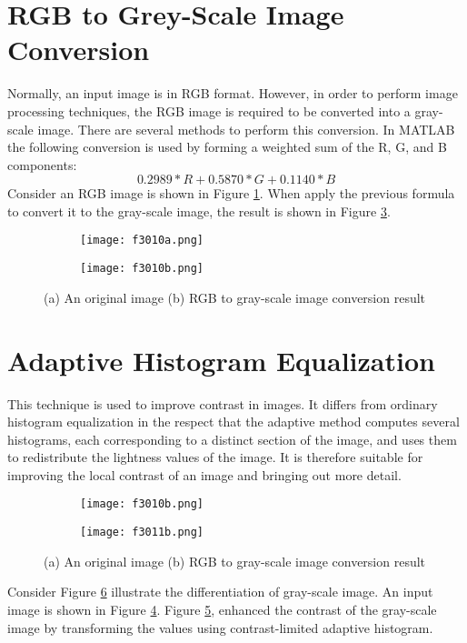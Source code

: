 \section{RGB to Grey-Scale Image Conversion}
Normally, an input image is in RGB format. However, in order to perform image processing techniques, the RGB image is required to be converted into a gray-scale image. There are several methods to perform this conversion. In MATLAB the following conversion is used by forming a weighted sum of the R, G, and B components:
\begin{equation}
	0.2989 * R + 0.5870 * G + 0.1140 * B
\end{equation}
Consider an RGB image is shown in Figure \ref{fig:f3010a}. When apply the previous formula to convert it to the gray-scale image, the result is shown in Figure \ref{fig:f3010b}.
\begin{figure}
	\centering
	\begin{subfigure}[b]{0.3\textwidth}
		\texttt{[image: f3010a.png]}
		\caption{}\label{fig:f3010a}
	\end{subfigure}
	\begin{subfigure}[b]{0.3\textwidth}
		\texttt{[image: f3010b.png]}
		\caption{}\label{fig:f3010b}
	\end{subfigure}
	\caption{(a) An original image (b) RGB to gray-scale image conversion result}
\end{figure}


\section{Adaptive Histogram Equalization}\label{sec:3.4}
This technique is used to improve contrast in images. It differs from ordinary histogram equalization in the respect that the adaptive method computes several histograms, each corresponding to a distinct section of the image, and uses them to redistribute the lightness values of the image. It is therefore suitable for improving the local contrast of an image and bringing out more detail.
\begin{figure}
	\centering
	\begin{subfigure}[b]{0.3\textwidth}
		\texttt{[image: f3010b.png]}
		\caption{}\label{fig:f3011a}
	\end{subfigure}
	\begin{subfigure}[b]{0.3\textwidth}
		\texttt{[image: f3011b.png]}
		\caption{}\label{fig:f3011b}
	\end{subfigure}
	\caption{(a) An original image (b) RGB to gray-scale image conversion result}\label{fig:f3011}
\end{figure}
Consider Figure \ref{fig:f3011} illustrate the differentiation of gray-scale image. An input image is shown in Figure \ref{fig:f3011a}. Figure \ref{fig:f3011b}, enhanced the contrast of the gray-scale image by transforming the values using contrast-limited adaptive histogram. 


